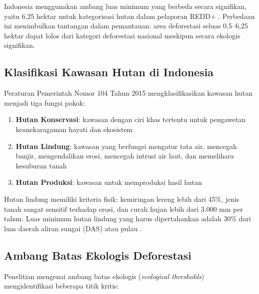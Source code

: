 \documentclass[12pt,a4paper]{article}
\begin{document}
Indonesia menggunakan ambang luas minimum yang berbeda secara signifikan, yaitu
6,25 hektar untuk kategorisasi hutan dalam pelaporan REDD+ \cite{wri2024forest,
unfccc2022indonesia}. Perbedaan ini menimbulkan tantangan dalam pemantauan: area
deforestasi seluas 0,5--6,25 hektar dapat lolos dari kategori deforestasi nasional
meskipun secara ekologis signifikan.

\subsection{Klasifikasi Kawasan Hutan di Indonesia}

Peraturan Pemerintah Nomor 104 Tahun 2015 mengklasifikasikan kawasan hutan menjadi
tiga fungsi pokok:

\begin{enumerate}[nosep]
    \item \textbf{Hutan Konservasi}: kawasan dengan ciri khas tertentu untuk
          pengawetan keanekaragaman hayati dan ekosistem
    \item \textbf{Hutan Lindung}: kawasan yang berfungsi mengatur tata air,
          mencegah banjir, mengendalikan erosi, mencegah intrusi air laut, dan
          memelihara kesuburan tanah
    \item \textbf{Hutan Produksi}: kawasan untuk memproduksi hasil hutan
\end{enumerate}

Hutan lindung memiliki kriteria fisik: kemiringan lereng lebih dari 45\%, jenis
tanah sangat sensitif terhadap erosi, dan curah hujan lebih dari 3.000 mm per tahun.
Luas minimum hutan lindung yang harus dipertahankan adalah 30\% dari luas daerah
aliran sungai (DAS) atau pulau \cite{unfccc2022indonesia}.

\subsection{Ambang Batas Ekologis Deforestasi}

Penelitian mengenai ambang batas ekologis (\textit{ecological thresholds})
mengidentifikasi beberapa titik kritis:
\end{document}
